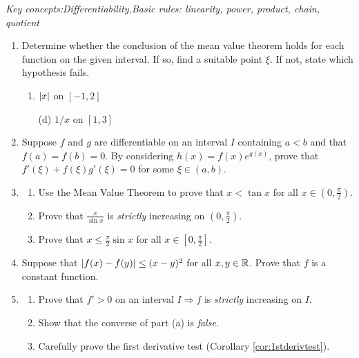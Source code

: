 

\begin{exercises}{}
	\emph{Key concepts:\quad Differentiability,\quad Basic rules: linearity, power, product, chain, quotient}

	\begin{enumerate}\itemsep2pt
	  \item Determine whether the conclusion of the mean value theorem holds for each function on the given interval. If so, find a suitable point $\xi$. If not, state which hypothesis fails.
	  \begin{enumerate}
	    \item {}
	    \space{}
	    \space $\left| x\right|$ on $[-1,2]$
	    \item[(d)] 
	    \space $1/x$ on $[1,3]$
	  \end{enumerate}
	  
	  
	  \item Suppose $f$ and $g$ are differentiable on an interval $I$ containing $a<b$ and that $f(a)=f(b)=0$. By considering $h(x)=f(x)e^{g(x)}$, prove that $f'(\xi)+f(\xi)g'(\xi)=0$ for some $\xi\in (a,b)$.
	  
	  
	  \item\begin{enumerate}
	    \item Use the Mean Value Theorem to prove that $x<\tan x$ for all $x\in(0,\frac\pi 2)$.
	    \item Prove that $\frac{x}{\sin x}$ is \emph{strictly} increasing on $(0,\frac\pi 2)$.
	    \item Prove that $x\le\frac{\pi}2\sin x$ for all $x\in[0,\frac\pi 2]$.
	  \end{enumerate}
	  
	  
	  \item Suppose that $\left| f(x)-f(y)\right|\le (x-y)^2$ for all $x,y\in\mathbb{R}$. Prove that $f$ is a constant function.  
	  
		\item\label{exs:mvtstrictincrease}
		\begin{enumerate}
		  \item Prove that $f'>0$ on an interval $I\Longrightarrow f$ is \emph{strictly} increasing on $I$.
		  \item Show that the converse of part (a) is \emph{false.}
	  	\item Carefully prove the first derivative test (Corollary \ref{cor:1stderivtest}).
		\end{enumerate}
		

\end{enumerate}
\end{exercises}

